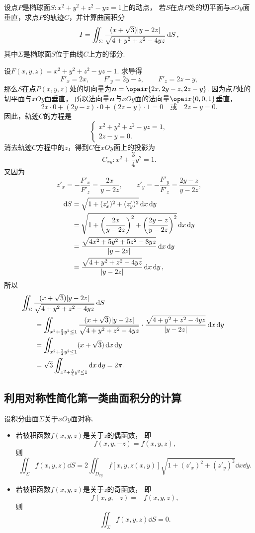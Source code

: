 \begin{example}
设点\(P\)是椭球面\(S: x^2 + y^2 + z^2 - yz = 1\)上的动点，
若\(S\)在点\(P\)处的切平面与\(xOy\)面垂直，求点\(P\)的轨迹\(C\)，并计算曲面积分\[
	I = \iint_\Sigma \frac{(x+\sqrt{3}) \abs{y-2z}}{\sqrt{4+y^2+z^2-4yz}} \dd{S},
\]
其中\(\Sigma\)是椭球面\(S\)位于曲线\(C\)上方的部分.
\begin{solution}
设\(F(x,y,z) = x^2 + y^2 + z^2 - yz - 1\).
求导得\[
	F'_x = 2x, \qquad
	F'_y = 2y - z, \qquad
	F'_z = 2z - y,
\]
那么\(S\)在点\(P(x,y,z)\)处的切向量为\(\vb{n} = \opair{2x,2y-z,2z-y}\).
因为点\(P\)处的切平面与\(xOy\)面垂直，
所以法向量\(\boldsymbol{n}\)与\(xOy\)面的法向量\(\opair{0,0,1}\)垂直，\[
	2x\cdot0 + (2y-z)\cdot0+(2z-y)\cdot1=0
	\quad\text{或}\quad
	2z-y=0.
\]
因此，轨迹\(C\)的方程是\[
	\begin{cases}
		x^2 + y^2 + z^2 - yz = 1, \\
		2z-y=0.
	\end{cases}
\]
消去轨迹\(C\)方程中的\(z\)，得到\(C\)在\(xOy\)面上的投影为\[
	C_{xy}: x^2+\frac{3}{4}y^2=1.
\]
又因为\[
	z'_x = - \frac{F'_x}{F'_z} = \frac{2x}{y-2z}, \qquad
	z'_y = - \frac{F'_y}{F'_z} = \frac{2y-z}{y-2z},
\]
\begin{align*}
	\dd{S} &= \sqrt{1+(z'_x)^2+(z'_y)^2} \dd{x}\dd{y} \\
	&= \sqrt{1+\left(\frac{2x}{y-2z}\right)^2+\left(\frac{2y-z}{y-2z}\right)^2} \dd{x}\dd{y} \\
	&= \frac{\sqrt{4x^2+5y^2+5z^2-8yz}}{\abs{y-2z}} \dd{x}\dd{y} \\
	&= \frac{\sqrt{4+y^2+z^2-4yz}}{\abs{y-2z}} \dd{x}\dd{y},
\end{align*}
所以\begin{align*}
	&\hspace{-20pt}
	\iint_\Sigma \frac{(x+\sqrt{3}) \abs{y-2z}}{\sqrt{4+y^2+z^2-4yz}} \dd{S} \\
	&= \iint_{x^2+\frac{3}{4}y^2\leq1} \frac{(x+\sqrt{3}) \abs{y-2z}}{\sqrt{4+y^2+z^2-4yz}}
		\cdot \frac{\sqrt{4+y^2+z^2-4yz}}{\abs{y-2z}} \dd{x}\dd{y} \\
	&= \iint_{x^2+\frac{3}{4}y^2\leq1} (x+\sqrt{3}) \dd{x}\dd{y} \\
	&= \sqrt{3} \iint_{x^2+\frac{3}{4}y^2\leq1} \dd{x}\dd{y}
	= 2\pi.
\end{align*}
\end{solution}
\end{example}

\subsection{利用对称性简化第一类曲面积分的计算}
设积分曲面\(\Sigma\)关于\(xOy\)面对称.
\begin{itemize}
	\item 若被积函数\(f(x,y,z)\)是关于\(z\)的偶函数，
	即\[
		f(x,y,-z) = f(x,y,z),
	\]
	则\[
		\iint_\Sigma f(x,y,z) \dd{S}
		= 2 \iint_{D_{xy}} f[x,y,z(x,y)] \sqrt{1+(z'_x)^2+(z'_y)^2} \dd{x}\dd{y}.
	\]

	\item 若被积函数\(f(x,y,z)\)是关于\(z\)的奇函数，
	即\[
		f(x,y,-z) = -f(x,y,z),
	\]
	则\[
		\iint_\Sigma f(x,y,z) \dd{S} = 0.
	\]
\end{itemize}

